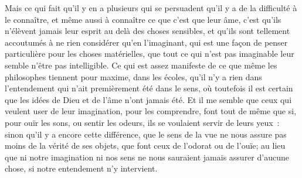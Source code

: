 \documentclass[french,twoside]{book} %
\begin{document}
Mais ce qui fait qu'il y en a plusieurs qui se persuadent qu'il y a de la difficulté à le connaître, et même aussi à connaître ce que c'est que leur âme, c'est qu'ils n'élèvent jamais leur esprit au delà des choses sensibles, et qu'ils sont tellement accoutumés à ne rien considérer qu'en l'imaginant, qui est une façon de penser particulière pour les choses matérielles, que tout ce qui n'est pas imaginable leur semble n'être pas intelligible. Ce qui est assez manifeste de ce que même les philosophes tiennent pour maxime, dans les écoles, qu'il n'y a rien dans l'entendement qui n'ait premièrement été dans le sens, où toutefois il est certain que les idées de Dieu et de l'âme n'ont jamais été. Et il me semble que ceux qui veulent user de leur imagination, pour les comprendre, font tout de même que si, pour ouïr les sons, ou sentir les odeurs, ils se voulaient servir de leurs yeux : sinon qu'il y a encore cette différence, que le sens de la vue ne nous assure pas moins de la vérité de ses objets, que font ceux de l'odorat ou de l'ouïe; au lieu que ni notre imagination ni nos sens ne nous sauraient jamais assurer d'aucune chose, si notre entendement n'y intervient.\par
\end{document}
